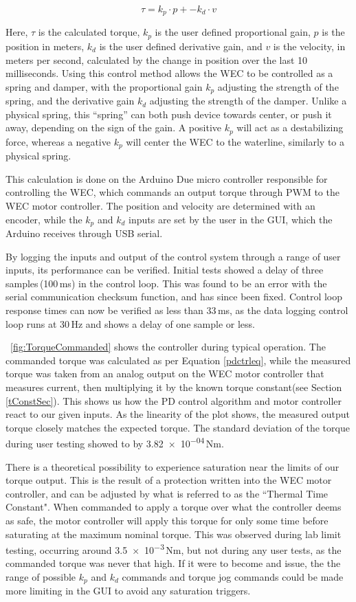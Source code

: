 \documentclass[11pt, letterpaper]{article}
\begin{document}
\begin{equation}  \label{pdctrleq}
  \tau = k_p \cdot p + -k_d \cdot v
\end{equation}

Here, $\tau$ is the calculated torque, $k_p$ is the user defined proportional gain, $p$ is the position in meters, $k_d$ is the user defined derivative gain, and $v$ is the velocity, in meters per second, calculated by the change in position over the last 10 milliseconds. 
Using this control method allows the WEC to be controlled as a spring and damper, with the proportional gain $k_p$ adjusting the strength of the spring, and the derivative gain $k_d$ adjusting the strength of the damper.
Unlike a physical spring, this ``spring'' can both push device towards center, or push it away, depending on the sign of the gain.
A positive $k_p$ will act as a destabilizing force, whereas a negative $k_p$ will center the WEC to the waterline, similarly to a physical spring.

This calculation is done on the Arduino Due micro controller responsible for controlling the WEC, which commands an output torque through PWM to the WEC motor controller.
The position and velocity are determined with an encoder, while the $k_p$ and $k_d$ inputs are set by the user in the GUI, which the Arduino receives through USB serial.

By logging the inputs and output of the control system through a range of user inputs, its performance can be verified.
Initial tests showed a delay of three samples\,(100\,ms) in the control loop.
This was found to be an error with the serial communication checksum function, and has since been fixed.
Control loop response times can now be verified as less than 33\,ms, as the data logging control loop runs at 30\,Hz and shows a delay of one sample or less.

\figurename~\ref{fig:TorqueCommanded} shows the controller during typical operation. 
The commanded torque was calculated as per Equation \ref{pdctrleq}, while the measured torque was taken from an analog output on the WEC motor controller that measures current, then multiplying it by the known torque constant(see Section \ref{tConstSec}).
This shows us how the PD control algorithm and motor controller react to our given inputs.
As the linearity of the plot shows, the measured output torque closely matches the expected torque.
The standard deviation of the torque during user testing showed to by \num{3.82e-04}\,Nm.


There is a theoretical possibility to experience saturation near the limits of our torque output.
This is the result of a protection written into the WEC motor controller, and can be adjusted by what is referred to as the ``Thermal Time Constant".
When commanded to apply a torque over what the controller deems as safe, the motor controller will apply this torque for only some time before saturating at the maximum nominal torque.
This was observed during lab limit testing, occurring around  \num{3.5e-3}\,Nm, but not during any user tests, as the commanded torque was never that high.
If it were to become and issue, the the range of possible $k_p$ and $k_d$ commands and torque jog commands could be made more limiting in the GUI to avoid any saturation triggers.
\end{document}
